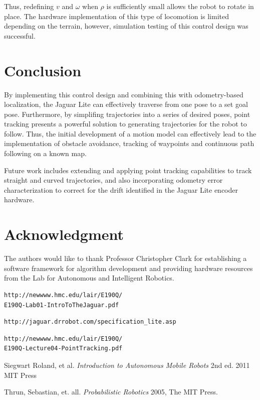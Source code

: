 \documentclass[conference]{IEEEtran}
\begin{document}
Thus, redefining $v$ and $\omega$ when $\rho$ is sufficiently small allows the robot to rotate 
in place. The hardware implementation of this type of locomotion is limited depending on the 
terrain, however, simulation testing of this control design was successful.


\section{Conclusion}
By implementing this control design and combining this with odometry-based localization, the Jaguar 
Lite can effectively traverse from one pose to a set goal pose.
Furthermore, by simplifing trajectories into a series of desired poses,
point tracking presents a powerful solution to generating trajectories 
for the robot to follow.  Thus, the initial development of a motion model
can effectively lead to the implementation of obstacle avoidance, 
tracking of waypoints and continuous path following on a known map.

Future work 
includes extending and applying point tracking capabilities to track 
straight and curved trajectories, and also incorporating odometry error 
characterization to correct for the drift identified in the Jaguar Lite encoder hardware.


\section*{Acknowledgment}


The authors would like to thank Professor Christopher Clark for 
establishing a software framework for algorithm development and
 providing hardware resources from the Lab for Autonomous and
 Intelligent Robotics.




\begin{thebibliography}{1}

\begin{verbatim}
http://newwww.hmc.edu/lair/E190Q/
E190Q-Lab01-IntroToTheJaguar.pdf
\end{verbatim}

\begin{verbatim}
http://jaguar.drrobot.com/specification_lite.asp
\end{verbatim}

\begin{verbatim}
http://newwww.hmc.edu/lair/E190Q/
E190Q-Lecture04-PointTracking.pdf
\end{verbatim}

Siegwart Roland, et al. \emph{Introduction to Autonomous Mobile Robots} 2nd ed. 
2011 MIT Press

Thrun, Sebastian, et. all. \emph{Probabilistic Robotics}
2005, The MIT Press.


\end{thebibliography}




\end{document}
